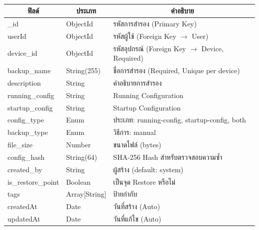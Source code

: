 \begin{table}[H]
    \caption{}
    \label{tab:config-backup-structure}
    \fontSixTeen 
    \begin{tabularx}{\textwidth}{|l|l|X|} 
        \hline
        \multicolumn{1}{|c|}{\textbf{ฟิลด์}} & \multicolumn{1}{c|}{\textbf{ประเภท}} & \multicolumn{1}{c|}{\textbf{คำอธิบาย}} \\
        \hline
        \_id & ObjectId & รหัสการสำรอง (Primary Key) \\
        \hline
        userId & ObjectId & รหัสผู้ใช้ (Foreign Key $\rightarrow$ User) \\
        \hline
        device\_id & ObjectId & รหัสอุปกรณ์ (Foreign Key $\rightarrow$ Device, Required) \\
        \hline
        backup\_name & String(255) & ชื่อการสำรอง (Required, Unique per device) \\
        \hline
        description & String & คำอธิบายการสำรอง \\
        \hline
        running\_config & String & Running Configuration \\
        \hline
        startup\_config & String & Startup Configuration \\
        \hline
        config\_type & Enum & ประเภท: running-config, startup-config, both \\
        \hline
        backup\_type & Enum & วิธีการ: manual \\
        \hline
        file\_size & Number & ขนาดไฟล์ (bytes) \\
        \hline
        config\_hash & String(64) & SHA-256 Hash สำหรับตรวจสอบความซ้ำ \\
        \hline
        created\_by & String & ผู้สร้าง (default: system) \\
        \hline
        is\_restore\_point & Boolean & เป็นจุด Restore หรือไม่ \\
        \hline
        tags & Array[String] & ป้ายกำกับ \\
        \hline
        createdAt & Date & วันที่สร้าง (Auto) \\
        \hline
        updatedAt & Date & วันที่แก้ไข (Auto) \\
        \hline
    \end{tabularx}
\end{table}


